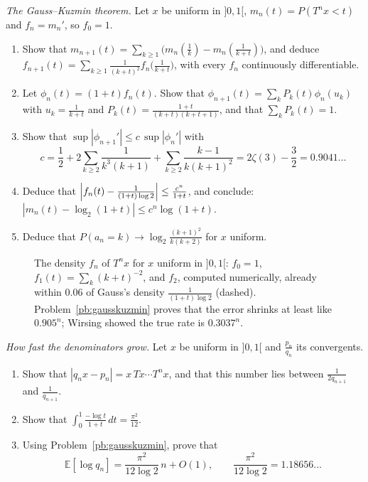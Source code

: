 \begin{exercise}[Journey]\label{pb:gausskuzmin}
\emph{The Gauss--Kuzmin theorem.} Let $x$ be uniform in $]0,1[$, $m_n(t)=P(T^nx<t)$ and $f_n=m_n'$, so $f_0=1$.
\begin{enumerate}[label=(\alph*)]
\item Show that $m_{n+1}(t)=\sum_{k\ge1}\bigl(m_n(\frac1k)-m_n(\frac1{k+t})\bigr)$, and deduce
$f_{n+1}(t)=\sum_{k\ge1}\frac1{(k+t)^2}f_n\bigl(\frac1{k+t}\bigr)$, with every $f_n$ continuously differentiable.
\item Let $\phi_n(t)=(1+t)f_n(t)$. Show that $\phi_{n+1}(t)=\sum_kP_k(t)\phi_n(u_k)$ with $u_k=\frac1{k+t}$ and
$P_k(t)=\frac{1+t}{(k+t)(k+t+1)}$, and that $\sum_kP_k(t)=1$.
\item Show that $\sup|\phi_{n+1}'|\le c\,\sup|\phi_n'|$ with
\[
c=\frac12+2\sum_{k\ge2}\frac1{k^3(k+1)}+\sum_{k\ge2}\frac{k-1}{k(k+1)^2}=2\zeta(3)-\frac32=0.9041\ldots
\]
\item Deduce that $\Bigl|f_n(t)-\frac1{(1+t)\log2}\Bigr|\le\frac{c^n}{1+t}$, and conclude: $|m_n(t)-\log_2(1+t)|\le c^n\log(1+t)$.
\item Deduce that $P(a_n=k)\to\log_2\frac{(k+1)^2}{k(k+2)}$ for $x$ uniform.
\end{enumerate}
\end{exercise}

\begin{figure}[ht]
\centering
{}
\caption{The density $f_n$ of $T^nx$ for $x$ uniform in $]0,1[$: $f_0=1$, $f_1(t)=\sum_k(k+t)^{-2}$, and $f_2$, computed numerically,
already within $0.06$ of Gauss's density $\frac1{(1+t)\log2}$ (dashed). Problem~\ref{pb:gausskuzmin} proves that the error shrinks
at least like $0.905^n$; Wirsing showed the true rate is $0.3037^n$.}
\label{fig:gausskuzmin}
\end{figure}

\begin{exercise}[$\star\star$]\label{pb:levy}
\emph{How fast the denominators grow.} Let $x$ be uniform in $]0,1[$ and $\frac{p_n}{q_n}$ its convergents.
\begin{enumerate}[label=(\alph*)]
\item Show that $|q_nx-p_n|=x\,Tx\cdots T^nx$, and that this number lies between $\frac1{2q_{n+1}}$ and $\frac1{q_{n+1}}$.
\item Show that $\int_0^1\frac{-\log t}{1+t}\,dt=\frac{\pi^2}{12}$.
\item Using Problem~\ref{pb:gausskuzmin}, prove that
\[
\mathbb E[\log q_n]=\frac{\pi^2}{12\log2}\,n+O(1),\qquad\frac{\pi^2}{12\log2}=1.18656\ldots
\]
\end{enumerate}
\end{exercise}

